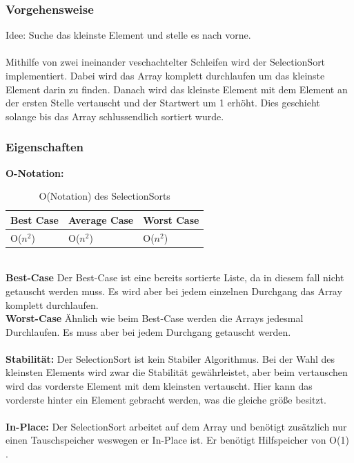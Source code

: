 \documentclass{article}
\begin{document}
\subsubsection{Vorgehensweise}
Idee: Suche das kleinste Element und stelle es nach vorne. \\ \\
Mithilfe von zwei ineinander veschachtelter Schleifen wird der SelectionSort implementiert. Dabei wird das Array komplett durchlaufen um das kleinste Element darin zu finden. Danach wird das kleinste Element mit dem Element an der ersten Stelle vertauscht und der Startwert um 1 erhöht. Dies geschieht solange bis das Array schlussendlich sortiert wurde.
\subsubsection{Eigenschaften}
\textbf{O-Notation:}
\begin{table}[h]
\centering
\begin{tabular}{lll}
	\hline
	\textbf{Best Case} & \textbf{Average Case} & \textbf{Worst Case} \\
	\hline
	O($n^{2}$) & O($n^{2}$) & O($n^{2}$) \\
	\hline
\end{tabular}
\caption{O(Notation) des SelectionSorts \cite{India2015Dataset}}
\label{tab:SelectionSort}
\end{table}
\\
\textbf{Best-Case} Der Best-Case ist eine bereits sortierte Liste, da in diesem fall nicht getauscht werden muss. Es wird aber bei jedem einzelnen Durchgang das Array komplett durchlaufen. \\
\textbf{Worst-Case} Ähnlich wie beim Best-Case werden die Arrays jedesmal Durchlaufen. Es muss aber bei jedem Durchgang getauscht werden.\\ \\
\textbf{Stabilität:} Der SelectionSort ist kein Stabiler Algorithmus. Bei der Wahl des kleinsten Elements wird zwar die Stabilität gewährleistet, aber beim vertauschen wird das vorderste Element mit dem kleinsten vertauscht. Hier kann das vorderste hinter ein Element gebracht werden, was die gleiche größe besitzt.   \\
\\
\textbf{In-Place:}  Der SelectionSort arbeitet auf dem Array und benötigt zusätzlich nur einen Tauschspeicher weswegen er In-Place ist. Er benötigt Hilfspeicher von O(1) \cite{India2015Dataset}. \\
\end{document}
